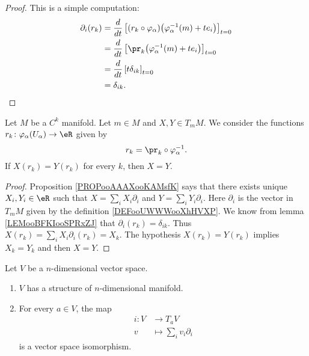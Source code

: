 \begin{proof}
	This is a simple computation:
	\begin{subequations}
		\begin{align}
			\partial_i(r_k) & =\frac{d}{dt} \left[ (r_k\circ \varphi_{\alpha})\big( \varphi_{\alpha}^{-1}(m)+te_i \big)  \right]_{t=0} \\
			                & =\frac{d}{dt} \left[ \pr_k\big( \varphi_{\alpha}^{-1}(m)+te_i \big)  \right]_{t=0}                       \\
			                & =\frac{d}{dt} \left[ t\delta_{ik}  \right]_{t=0}                                                         \\
			                & = \delta_{ik}.
		\end{align}
	\end{subequations}
\end{proof}

\begin{proposition}	\label{PROPooPXTVooKIzptQ}
	Let \( M\) be a \( C^k\) manifold. Let \( m\in M\) and \( X,Y\in T_mM\). We consider the functions \(r_k \colon \varphi_{\alpha}(U_{\alpha})\to \eR  \) given by
	\begin{equation}
		r_k=\pr_k\circ \varphi_{\alpha}^{-1}.
	\end{equation}
	If \( X(r_k)=Y(r_k)\) for every \( k\), then \( X=Y\).
\end{proposition}

\begin{proof}
	Proposition \ref{PROPooAAAXooKAMsfK} says that there exists unique \( X_i,Y_i\in \eR\) such that \( X=\sum_iX_i\partial_i\) and \( Y=\sum_iY_i\partial_i\). Here \( \partial_i\) is the vector in \( T_mM\) given by the definition \ref{DEFooUWWWooXhHVXP}. We know from lemma \ref{LEMooBFKIooSPRxZJ} that \( \partial_i(r_k)=\delta_{ik}\). Thus \( X(r_k)=\sum_iX_i\partial_i(r_k)=X_k\). The hypothesis \( X(r_k)=Y(r_k)\) implies \( X_k=Y_k\) and then \( X=Y\).
\end{proof}

\begin{proposition}     \label{PROPooJVSQooGvNqIx}
	Let \( V\) be a \( n\)-dimensional vector space.
	\begin{enumerate}
		\item
		      \( V\) has a structure of \( n\)-dimensional manifold.
		\item
		      For every \( a\in V\), the map
		      \begin{equation}
			      \begin{aligned}
				      i\colon V & \to T_aV                    \\
				      v         & \mapsto \sum_iv_i\partial_i
			      \end{aligned}
		      \end{equation}
		      is a vector space isomorphism.
	\end{enumerate}
\end{proposition}


